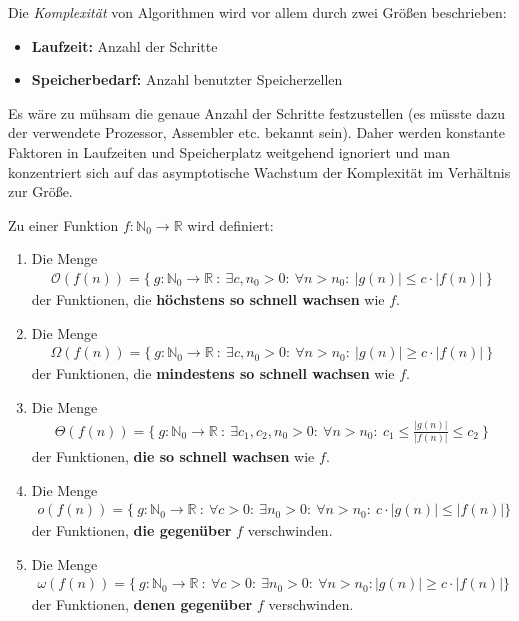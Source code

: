Die \emph{Komplexität} von Algorithmen wird vor allem durch zwei Größen beschrieben:
\begin{itemize}
	\item \textbf{Laufzeit:} Anzahl der Schritte
	\item \textbf{Speicherbedarf: } Anzahl benutzter Speicherzellen
\end{itemize}
Es wäre zu mühsam die genaue Anzahl der Schritte festzustellen (es müsste dazu der verwendete Prozessor, Assembler etc. bekannt sein). Daher werden konstante Faktoren in Laufzeiten und Speicherplatz weitgehend ignoriert und man konzentriert sich auf das asymptotische Wachstum der Komplexität im Verhältnis zur Größe.

\begin{defi}
	Zu einer Funktion $f : \mathbb{N}_{0} \rightarrow \mathbb{R}$ wird definiert:
	\begin{enumerate}[label=(\roman*)]
		\item Die Menge
		      \begin{gather*}
			      \mathcal{O}(f(n)) = \{ \ g : \mathbb{N}_0 \rightarrow \mathbb{R} \ : \ \exists c, n_0 > 0 : \ \forall n > n_0 : \ |g(n)| \le c \cdot |f(n)| \ \}
		      \end{gather*}
		      der Funktionen, die \textbf{höchstens so schnell wachsen} wie $f$.

		\item Die Menge
		      \begin{gather*}
			      \Omega(f(n)) = \{ \ g : \mathbb{N}_0 \rightarrow \mathbb{R} \ : \ \exists c, n_0 > 0 : \ \forall n > n_0 : \ |g(n)| \ge c \cdot |f(n)| \ \}
		      \end{gather*}
		      der Funktionen, die \textbf{mindestens so schnell wachsen} wie $f$.

		\item Die Menge
		      \begin{gather*}
			      \Theta(f(n)) = \{ \ g : \mathbb{N}_0 \rightarrow \mathbb{R} \ : \ \exists c_1, c_2, n_0 > 0 : \ \forall n > n_0 : \ c_1 \le \frac{ | g(n) | }{ | f(n) | } \le c_2 \ \}
		      \end{gather*}
		      der Funktionen, \textbf{die so schnell wachsen} wie $f$.

		\item Die Menge
		      \begin{gather*}
			      o(f(n)) = \{ \ g : \mathbb{N}_0 \rightarrow \mathbb{R} \ : \ \forall c > 0 : \ \exists n_0 > 0 : \ \forall n > n_0 : \ c \cdot |g(n)| \le |f(n)| \}
		      \end{gather*}
		      der Funktionen, \textbf{die gegenüber} $f$ verschwinden.

		\item Die Menge
		      \begin{gather*}
			      \omega(f(n)) = \{ \ g : \mathbb{N}_0 \rightarrow \mathbb{R} \ : \ \forall c > 0 : \ \exists n_0 > 0 : \ \forall n > n_0 : |g(n)| \ge c \cdot |f(n)| \}
		      \end{gather*}
		      der Funktionen, \textbf{denen gegenüber} $f$ verschwinden.
	\end{enumerate}
\end{defi}


